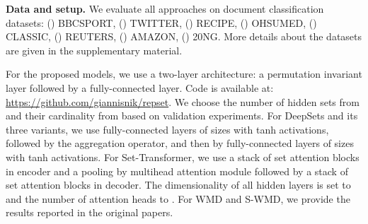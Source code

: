 \documentclass[twoside]{article}
\begin{document}
\begin{table*}[t] 
  \centering
  \caption{Terms of the employed pre-trained model that are most similar to the elements and centroids of  hidden sets.}
  \label{tab:latent_sets}
\end{table*}

\noindent\textbf{Data and setup.}
We evaluate all approaches on  document classification datasets: () BBCSPORT, () TWITTER, () RECIPE, () OHSUMED, () CLASSIC, () REUTERS, () AMAZON, () 20NG.
More details about the datasets are given in the supplementary material.

For the proposed models, we use a two-layer architecture: a permutation invariant layer followed by a fully-connected layer.
Code is available at: \url{https://github.com/giannisnik/repset}.
We choose the number of hidden sets from  and their cardinality from  based on validation experiments.
For DeepSets and its three variants, we use  fully-connected layers of sizes  with tanh activations, followed by the aggregation operator, and then by  fully-connected layers of sizes  with tanh activations.
For Set-Transformer, we use a stack of set attention blocks in encoder and a pooling by multihead attention module followed by a stack of set attention blocks in decoder.
The dimensionality of all hidden layers is set to  and the number of attention heads to .
For WMD and S-WMD, we provide the results reported in the original papers.
\end{document}
